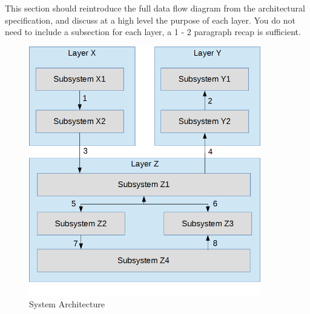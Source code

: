 This section should reintroduce the full data flow diagram from the architectural specification, and discuss at a high level the purpose of each layer. You do not need to include a subsection for each layer, a 1 - 2 paragraph recap is sufficient.

\begin{figure}[h!]
	\centering
 	\includegraphics[width=0.90\textwidth]{images/data_flow} %
 \caption{System Architecture}
\end{figure}
